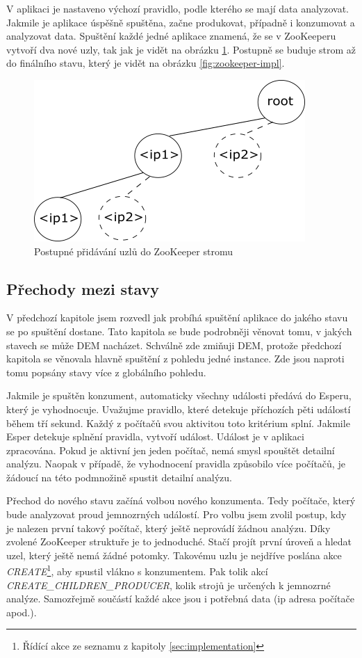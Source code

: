 \documentclass[
  digital, %
  table,   %
  nolof,     %
  nolot,     %
  oneside, %
  nocover,
  monochrome,
  12pt
]{fithesis3}
\begin{document}
V aplikaci je nastaveno výchozí pravidlo, podle kterého se mají data analyzovat. Jakmile je aplikace úspěšně spuštěna, začne produkovat, případně i konzumovat a analyzovat data. Spuštění každé jedné aplikace znamená, že se v ZooKeeperu vytvoří dva nové uzly, tak jak je vidět na obrázku  \ref{fig:app-start}. Postupně se buduje strom až do finálního stavu, který je vidět na obrázku \ref{fig:zookeeper-impl}.

\begin{figure}[H]
	\centering
    \includegraphics[width=.4\linewidth, height=.18\textheight]{images/app-start.png}
    \caption{Postupné přidávání uzlů do ZooKeeper stromu}
    \label{fig:app-start}
\end{figure}

\subsection{Přechody mezi stavy}
V předchozí kapitole jsem rozvedl jak probíhá spuštění aplikace do jakého stavu se po spuštění dostane. Tato kapitola se bude podrobněji věnovat tomu, v jakých stavech se může DEM nacházet. Schválně zde zmiňuji DEM, protože předchozí kapitola se věnovala hlavně spuštění z pohledu jedné instance. Zde jsou naproti tomu popsány stavy více z globálního pohledu.

Jakmile je spuštěn konzument, automaticky všechny události předává do Esperu, který je vyhodnocuje. Uvažujme pravidlo, které detekuje příchozích pěti událostí během tří sekund. Každý z počítačů svou aktivitou toto kritérium splní. Jakmile Esper detekuje splnění pravidla, vytvoří událost. Událost je v aplikaci zpracována. Pokud je aktivní jen jeden počítač, nemá smysl spouštět detailní analýzu. Naopak v případě, že vyhodnocení pravidla způsobilo více počítačů, je žádoucí na této podmnožině spustit detailní analýzu.

Přechod do nového stavu začíná volbou nového konzumenta. Tedy počítače, který bude analyzovat proud jemnozrných událostí. Pro volbu jsem zvolil postup, kdy je nalezen první takový počítač, který ještě neprovádí žádnou analýzu. Díky zvolené ZooKeeper struktuře je to jednoduché. Stačí projít první úroveň a hledat uzel, který ještě nemá žádné potomky. Takovému uzlu je nejdříve poslána akce \textit{CREATE}\footnote{Řídící akce ze seznamu z kapitoly \ref{sec:implementation}}, aby spustil vlákno s konzumentem. Pak tolik akcí \\ \textit{CREATE\_CHILDREN\_PRODUCER}, kolik strojů je určených k jemnozrné analýze. Samozřejmě součástí každé akce jsou i potřebná data (ip adresa počítače apod.).
\end{document}
